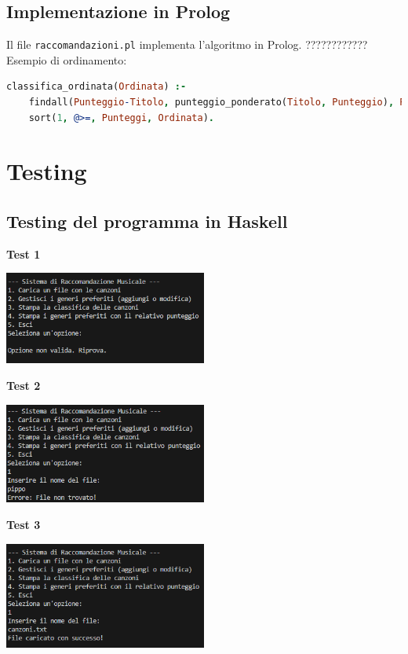 \documentclass[a4paper,11pt]{article}
\begin{document}
\subsection{Implementazione in Prolog}
Il file \texttt{raccomandazioni.pl} implementa l'algoritmo in Prolog. ???????????? Esempio di ordinamento:
\begin{lstlisting}[language=Prolog,caption=Ordinamento delle canzoni]
classifica_ordinata(Ordinata) :-
    findall(Punteggio-Titolo, punteggio_ponderato(Titolo, Punteggio), Punteggi),
    sort(1, @>=, Punteggi, Ordinata).
\end{lstlisting}


\newpage
\section{Testing}
\subsection{Testing del programma in Haskell}
\begin{center}
    \textbf{Test 1}
    \par
    \vspace{0.5cm}
    \includegraphics[width=0.5\textwidth]{htest1}
\end{center}
\begin{center}
    \textbf{Test 2}
    \par
    \vspace{0.5cm}
    \includegraphics[width=0.5\textwidth]{htest2}
\end{center}
\begin{center}
    \textbf{Test 3}
    \par
    \vspace{0.5cm}
    \includegraphics[width=0.5\textwidth]{htest3}
\end{center}
\end{document}
